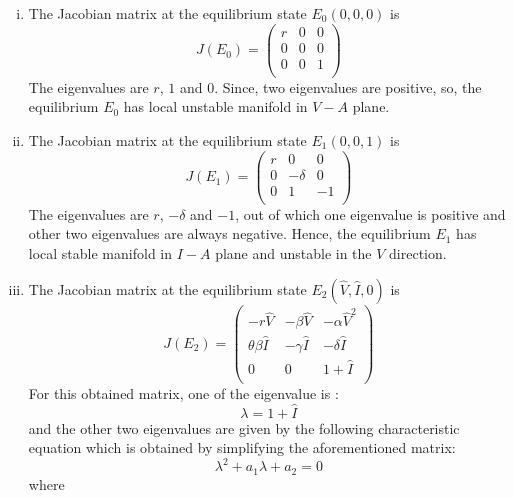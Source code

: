 \documentclass[12pt,a4wide]{report}
\numberwithin{equation}{chapter}
\numberwithin{theorem}{chapter}
\begin{document}
\begin{enumerate}[i).]
\item The Jacobian matrix at the equilibrium state $E_0(0,0,0)$ is
\begin{equation}\label{sec3:e29}
J(E_0)=
\left({\begin{matrix}
	r & 0 & 0\\
	0 & 0 & 0\\
	0 & 0 & 1\\
\end{matrix}}\right)
\end{equation}
The eigenvalues are $r$, $1$ and $0$. Since, two eigenvalues are positive, so, the equilibrium $E_0$ has local unstable manifold in $V-A$ plane.
\item The Jacobian matrix at the equilibrium state $E_1(0,0,1)$ is
\begin{equation}\label{sec3:e30}
J(E_1)=
\left({\begin{matrix}
	r & 0 & 0\\
	0 & -\delta & 0\\
	0 & 1 & -1\\
\end{matrix}}\right)
\end{equation}
The eigenvalues are $r$, $-\delta$ and $-1$, out of which one eigenvalue is positive and other two eigenvalues are always negative. Hence, the equilibrium $E_1$ has local stable manifold in $I-A$ plane and unstable in the $V$ direction.
\item The Jacobian matrix at the equilibrium state $E_2(\hat V, \hat I, 0)$ is
\begin{equation}\label{sec3:e31}
J(E_2)=
\left({\begin{matrix}
	-r\hat V & -\beta \hat V & -\alpha \hat V^2\\
	\theta \beta \hat I & -\gamma \hat I & -\delta \hat I\\
	0 & 0 & 1+\hat I\\
\end{matrix}}\right)
\end{equation}
For this obtained matrix, one of the eigenvalue is :
\begin{equation}
\lambda = 1+\hat I
\end{equation}
and the other two eigenvalues are given by the following characteristic equation which is obtained by simplifying the aforementioned matrix:
\begin{equation}
\lambda^2 + a_1\lambda + a_2 = 0
\end{equation}
where

\end{enumerate}
\end{document}
